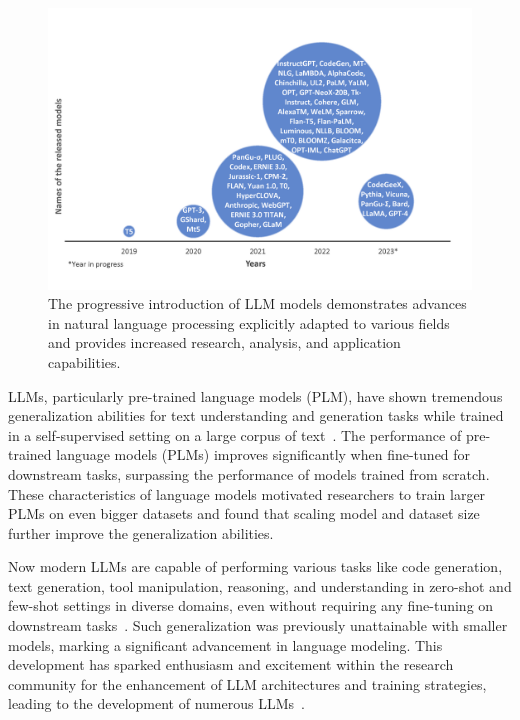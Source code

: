 \begin{figure}[tbp]
\centering
\includegraphics[width=2\columnwidth]{Figure/Bubble_Chart.png}
\caption{The progressive introduction of LLM models demonstrates advances in natural language processing explicitly adapted to various fields and provides increased research,  analysis, and application capabilities.}
\label{fig:LLMs_bubblechart}
\end{figure}

LLMs, particularly pre-trained language models (PLM), have shown tremendous generalization abilities for text understanding and generation tasks while trained in a self-supervised setting on a large corpus of text~\cite{Bert, ELMO, BART}. The performance of pre-trained language models (PLMs) improves significantly when fine-tuned for downstream tasks, surpassing the performance of models trained from scratch. These characteristics of language models motivated researchers to train larger PLMs on even bigger datasets and found that scaling model and dataset size further improve the generalization abilities. 

Now modern LLMs are capable of performing various tasks like code generation, text generation, tool manipulation, reasoning, and understanding in zero-shot and few-shot settings in diverse domains, even without requiring any fine-tuning on downstream tasks~\cite{GPT-3, BLOOM, OPT}. Such generalization was previously unattainable with smaller models, marking a significant advancement in language modeling. This development has sparked enthusiasm and excitement within the research community for the enhancement of LLM architectures and training strategies, leading to the development of numerous LLMs~\cite{T5, mT5, CPM-2, GPT-3, BLOOM, OPT, PaLM}. 

